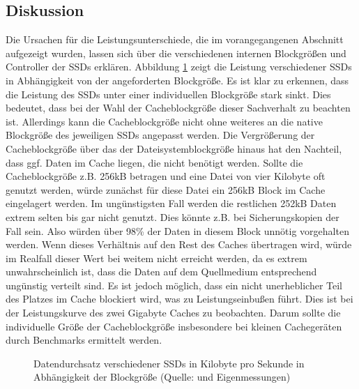 \subsection{Diskussion}
\label{chap7:synth:discu}

Die Ursachen für die Leistungsunterschiede, die im vorangegangenen Abschnitt aufgezeigt wurden, lassen sich über die
verschiedenen internen Blockgrößen und Controller der \acp{SSD} erklären. Abbildung \ref{img:cb} zeigt die Leistung verschiedener \acp{SSD} in Abhängigkeit von
der angeforderten Blockgröße. Es ist klar zu erkennen, dass die Leistung des \ac{SSD}s unter einer individuellen Blockgröße stark sinkt. Dies bedeutet, dass
bei der Wahl der Cacheblockgröße dieser Sachverhalt zu beachten ist. Allerdings kann die Cacheblockgröße nicht ohne weiteres an die native Blockgröße des
jeweiligen \ac{SSD}s angepasst werden. Die Vergrößerung der Cacheblockgröße über das der Dateisystemblockgröße hinaus hat den Nachteil, dass ggf. Daten im Cache
liegen, die nicht benötigt werden. Sollte die Cacheblockgröße z.B. 256kB betragen und eine Datei von vier Kilobyte oft genutzt werden, würde zunächst für diese
Datei ein 256kB Block im Cache eingelagert werden. Im ungünstigsten Fall werden die restlichen 252kB Daten extrem selten bis gar nicht genutzt. Dies könnte z.B.
bei Sicherungskopien der Fall sein. Also würden über 98\% der Daten in diesem Block unnötig vorgehalten werden. Wenn dieses Verhältnis auf den Rest des
Caches übertragen wird, würde im Realfall dieser Wert bei weitem nicht erreicht werden, da es extrem unwahrscheinlich ist, dass die Daten auf dem Quellmedium
entsprechend ungünstig verteilt sind. Es ist jedoch möglich, dass ein nicht unerheblicher Teil des Platzes im Cache blockiert wird, was zu Leistungseinbußen
führt. Dies ist bei der Leistungskurve des zwei Gigabyte Caches zu beobachten. Darum sollte die individuelle Größe der Cacheblockgröße insbesondere bei kleinen
Cachegeräten durch Benchmarks ermittelt werden.

\begin{figure}[b!]\centering
    \caption[Datendurchsatz verschiedener SSDs]{Datendurchsatz verschiedener SSDs in Kilobyte pro Sekunde in Abhängigkeit der Blockgröße (Quelle: \textcite{cb} und Eigenmessungen)}
    \label{img:cb}
\end{figure}

